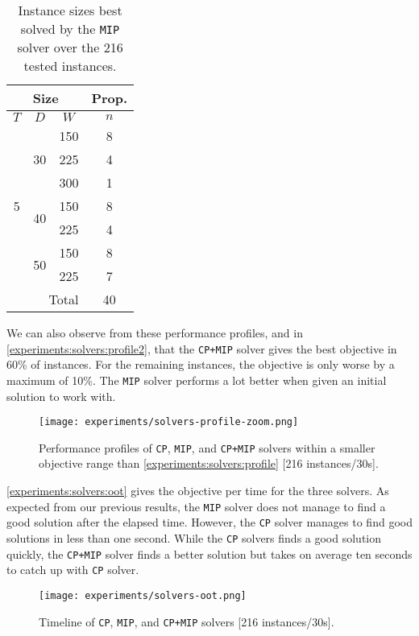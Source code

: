 \documentclass[../../thesis.tex]{subfiles}
\begin{document}
\begin{table}[H]
  \caption{Instance sizes best solved by the \texttt{MIP} solver over the 216 tested instances.}
  \label{instances:mip}
  \centering
  \begin{tabular}[t]{|c|c|c |c|}
    \hline
    \multicolumn{3}{|c|}{Size} & \multicolumn{1}{|c|}{Prop.} \\
    \hline 
    $T$ & $D$ & $W$ & $n$  \\
    \hline 
    \multirow{7}{*}{5} & \multirow{3}{*}{30} & 150 & 8  \\ 
    \cline{3-4}
     &  & 225 & 4  \\ 
     \cline{3-4}
     &  & 300 & 1  \\ 
     \cline{2-4}
     & \multirow{2}{*}{40} & 150 & 8  \\ 
     \cline{3-4}
     &  & 225 & 4  \\ 
     \cline{3-4}
     \cline{2-4}
     & \multirow{2}{*}{50} & 150 & 8  \\ 
     \cline{3-4}
     &  & 225 & 7  \\ 
     \hline
     \multicolumn{3}{|r|}{Total} & 40 \\
      \hline
  \end{tabular}
\end{table}

We can also observe from these performance profiles, and in \autoref{experiments:solvers:profile2}, that 
the \texttt{CP+MIP} solver gives the best objective in 60\% of instances. For the remaining instances, the objective is only worse by a maximum of 10\%. 
The \texttt{MIP} solver performs a lot better when given an initial solution to work with.


\begin{figure}
  \centering
  \texttt{[image: experiments/solvers-profile-zoom.png]}
  \caption{Performance profiles of \texttt{CP}, \texttt{MIP}, and \texttt{CP+MIP} solvers within a smaller objective range than \autoref{experiments:solvers:profile} [216 instances/30s].}
  \label{experiments:solvers:profile2}
\end{figure}



\autoref{experiments:solvers:oot} gives the objective per time for the three solvers. As expected from our previous results, the \texttt{MIP} solver does not 
manage to find a good solution after the elapsed time. 
However, the \texttt{CP} solver manages to find good solutions in less than one second. 
While the \texttt{CP} solvers finds a good solution quickly, the \texttt{CP+MIP} solver finds a better solution but takes on average ten seconds to catch up with \texttt{CP} solver.



\begin{figure}
  \centering
  \texttt{[image: experiments/solvers-oot.png]}
  \caption{Timeline of \texttt{CP}, \texttt{MIP}, and \texttt{CP+MIP} solvers [216 instances/30s].}
  \label{experiments:solvers:oot}
\end{figure}
\end{document}
